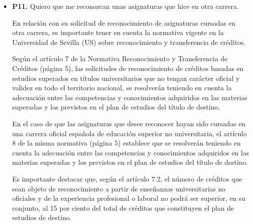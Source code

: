 \documentclass{article}
\begin{document}
\begin{itemize}
\begin{respuesta_agente}
Es importante tener en cuenta que existen plazos específicos para la modificación de la automatrícula y para la presentación de documentación. Además, algunos colectivos de estudiantes, como los que acceden por traslado de expediente, convalidación parcial de estudios extranjeros, o estudiantes de movilidad, pueden tener procedimientos y plazos diferentes.

Para una información más detallada y específica a tu situación, te recomendaría consultar directamente con la universidad o revisar el documento "R.R. NORMAS DE MATRICULA GRADO Y MASTER UNIVERSITARIO 2025-2026.pdf" y otros recursos proporcionados por la Universidad de Sevilla.
    \end{respuesta_agente}
    \vspace{0.2cm}
    \noindent\textbf{Documentos recuperados:} No se detectaron fuentes.

  \item \textbf{P11.} Quiero que me reconozcan unas asignaturas que hice en otra carrera. \\
    \begin{respuesta_agente}
      En relación con su solicitud de reconocimiento de asignaturas cursadas en otra carrera, es importante tener en cuenta la normativa vigente en la Universidad de Sevilla (US) sobre reconocimiento y transferencia de créditos. 

Según el artículo 7 de la Normativa Reconocimiento y Transferencia de Créditos (página 5), las solicitudes de reconocimiento de créditos basadas en estudios superados en títulos universitarios que no tengan carácter oficial y validez en todo el territorio nacional, se resolverán teniendo en cuenta la adecuación entre las competencias y conocimientos adquiridos en las materias superadas y los previstos en el plan de estudios del título de destino.

En el caso de que las asignaturas que desee reconocer hayan sido cursadas en una carrera oficial española de educación superior no universitaria, el artículo 8 de la misma normativa (página 5) establece que se resolverán teniendo en cuenta la adecuación entre las competencias y conocimientos adquiridos en las materias superadas y los previstos en el plan de estudios del título de destino.

Es importante destacar que, según el artículo 7.2, el número de créditos que sean objeto de reconocimiento a partir de enseñanzas universitarias no oficiales y de la experiencia profesional o laboral no podrá ser superior, en su conjunto, al 15 por ciento del total de créditos que constituyen el plan de estudios de destino.


\end{respuesta_agente}
\end{itemize}
\end{document}
